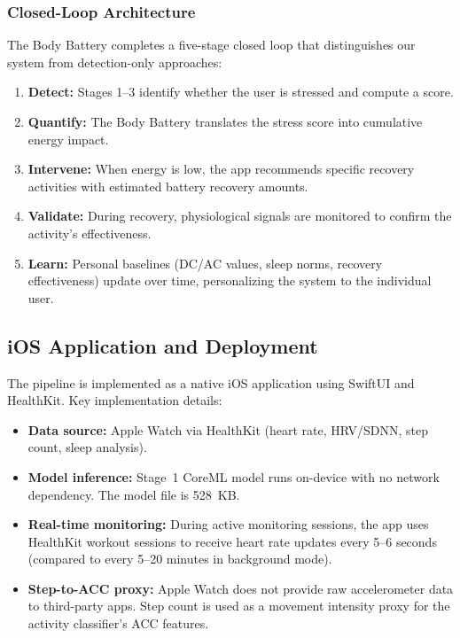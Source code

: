 \documentclass[12pt,letterpaper]{article}
\begin{document}
\subsubsection{Closed-Loop Architecture}

The Body Battery completes a five-stage closed loop that distinguishes our system from detection-only approaches:

\begin{enumerate}
    \item \textbf{Detect:} Stages 1--3 identify whether the user is stressed and compute a score.
    \item \textbf{Quantify:} The Body Battery translates the stress score into cumulative energy impact.
    \item \textbf{Intervene:} When energy is low, the app recommends specific recovery activities with estimated battery recovery amounts.
    \item \textbf{Validate:} During recovery, physiological signals are monitored to confirm the activity's effectiveness.
    \item \textbf{Learn:} Personal baselines (DC/AC values, sleep norms, recovery effectiveness) update over time, personalizing the system to the individual user.
\end{enumerate}

\subsection{iOS Application and Deployment}

The pipeline is implemented as a native iOS application using SwiftUI and HealthKit. Key implementation details:

\begin{itemize}
    \item \textbf{Data source:} Apple Watch via HealthKit (heart rate, HRV/SDNN, step count, sleep analysis).
    \item \textbf{Model inference:} Stage~1 CoreML model runs on-device with no network dependency. The model file is 528~KB.
    \item \textbf{Real-time monitoring:} During active monitoring sessions, the app uses HealthKit workout sessions to receive heart rate updates every 5--6 seconds (compared to every 5--20 minutes in background mode).
    \item \textbf{Step-to-ACC proxy:} Apple Watch does not provide raw accelerometer data to third-party apps. Step count is used as a movement intensity proxy for the activity classifier's ACC features.
\end{itemize}
\end{document}
